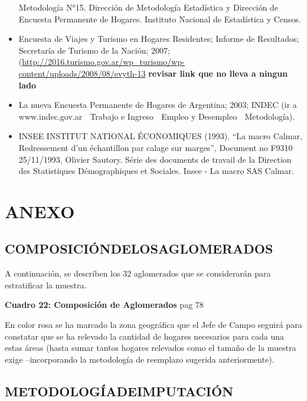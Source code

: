 \documentclass[
  openany]{book}
\begin{document}
\begin{itemize}
  Metodología N°15. Dirección de Metodología Estadística y Dirección
  de Encuesta Permanente de Hogares. Instituto Nacional de Estadística
  y Censos.
\item
  Encuesta de Viajes y Turismo en Hogares Residentes; Informe de
  Resultados; Secretaría de Turismo de la Nación; 2007;
  (\href{http://2016.turismo.gov.ar/wp_turismo/wp-content/uploads/2008/08/evyth-13-08.pdf}{http://2016.turismo.gov.ar/wp\_turismo/wp-content/uploads/2008/08/evyth-13} \textbf{revisar link que no lleva a ningun lado}
\item
  La nueva Encuesta Permanente de Hogares de Argentina; 2003; INDEC
  (ir a www.indec.gov.ar  Trabajo e Ingreso  Empleo y Desempleo 
  Metodología).
\item
  INSEE INSTITUT NATIONAL ÉCONOMIQUES (1993). ``La macro Calmar,
  Redressement d'un échantillon par calage sur marges'', Document no
  F9310 25/11/1993, Olivier Sautory. Série des documents de travail de
  la Direction des Statistiques Démographiques et Sociales. Insee - La
  macro SAS Calmar.
\end{itemize}

\hypertarget{anexo-1}{%
\chapter{\texorpdfstring{\textbf{ANEXO}}{ANEXO}}\label{anexo-1}}

\hypertarget{composiciuxf3ndelosaglomerados}{%
\section{\texorpdfstring{\textbf{COMPOSICIÓNDELOSAGLOMERADOS}}{COMPOSICIÓNDELOSAGLOMERADOS}}\label{composiciuxf3ndelosaglomerados}}

A continuación, se describen los 32 aglomerados que se considerarán para estratificar la muestra.

\textbf{Cuadro 22: Composición de Aglomerados} pag 78

En color rosa se ha marcado la zona geográfica que el Jefe de Campo seguirá para constatar que se ha relevado la cantidad de hogares necesarios para cada una estas áreas (hasta sumar tantos hogares relevados como el tamaño de la muestra exige --incorporando la metodología de reemplazo sugerida anteriormente).

\hypertarget{metodologuxedadeimputaciuxf3n}{%
\section{\texorpdfstring{\textbf{METODOLOGÍADEIMPUTACIÓN}}{METODOLOGÍADEIMPUTACIÓN}}\label{metodologuxedadeimputaciuxf3n}}
\end{document}

